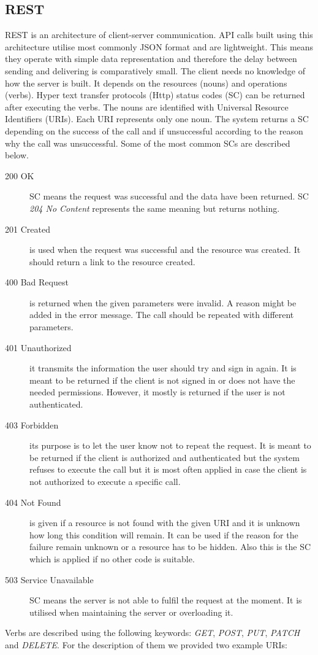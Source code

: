 	\subsection{REST} \label{analysisREST} \cite{rest}
	REST is an architecture of client-server communication. API calls built using this architecture utilise most commonly JSON format and are lightweight. This means they operate with simple data representation and therefore the delay between sending and delivering is comparatively small. The client needs no knowledge of how the server is built. It depends on the resources (nouns) and operations (verbs). Hyper text transfer protocols (Http) status codes (SC) can be returned after executing the verbs. The nouns are identified with Universal Resource Identifiers (URIs). Each URI represents only one noun. The system returns a SC depending on the success of the call and if unsuccessful according to the reason why the call was unsuccessful. Some of the most common SCs are described below. \cite{rfc-2616}
	\begin {description}
	\item [200 OK] SC means the request was successful and the data have been returned. SC \textit{204 No Content} represents the same meaning but returns nothing.
	\item [201 Created] is used when the request was successful and the resource was created. It should return a link to the resource created.
	\item [400 Bad Request] is returned when the given parameters were invalid. A reason might be added in the error message. The call should be repeated with different parameters.
	\item [401 Unauthorized] it transmits the information the user should try and sign in again. It is meant to be returned if the client is not signed in or does not have the needed permissions. However, it mostly is returned if the user is not authenticated.
	\item [403 Forbidden] its purpose is to let the user know not to repeat the request. It is meant to be returned if the client is authorized and authenticated but the system refuses to execute the call but it is most often applied in case the client is not authorized to execute a specific call.
	\item [404 Not Found] is given if a resource is not found with the given URI and it is unknown how long this condition will remain. It can be used if the reason for the failure remain unknown or a resource has to be hidden. Also this is the SC which is applied if no other code is suitable.
	\item [503 Service Unavailable] SC means the server is not able to fulfil the request at the moment. It is utilised when maintaining the server or overloading it.
	\end{description}	
	Verbs are described using the following keywords: \textit{GET}, \textit{POST}, \textit{PUT}, \textit{PATCH} and \textit{DELETE}. For the description of them we provided two example URIs:
	
